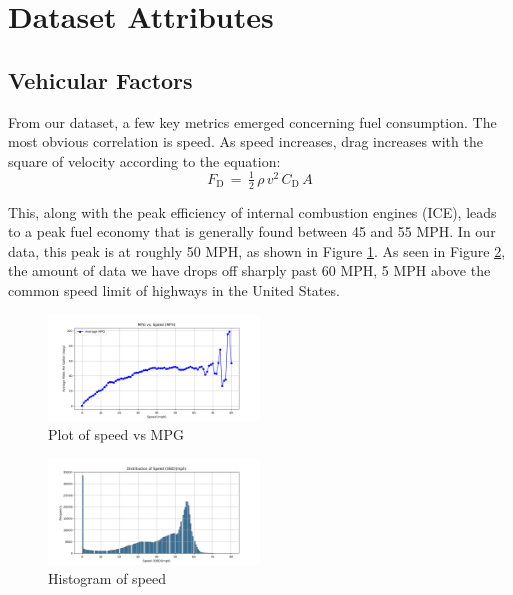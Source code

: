 \documentclass[letterpaper]{article}
\begin{document}
\section*{Dataset Attributes}

\subsection*{Vehicular Factors}

From our dataset, a few key metrics emerged concerning fuel consumption. 
The most obvious correlation is speed. As speed increases, drag increases 
with the square of velocity according to the equation: 
\[
    \displaystyle F_{\mathrm {D} }\,=\,{\tfrac {1}{2}}\,\rho \,v^{2}\,C_{\mathrm {D} }\,A
\] 

This, along with the peak efficiency of internal combustion engines (ICE), 
leads to a peak fuel economy that is generally found between 45 and 55 MPH. 
In our data, this peak is at roughly 50 MPH, as shown in Figure \ref{fig:mpgspeed}. 
As seen in Figure \ref{fig:histmpgspeed}, the amount of data we have drops off sharply 
past 60 MPH, 5 MPH above the common speed limit of highways in the United 
States.

\begin{figure}[htbp]
    \centering
    \includegraphics[width=0.5\textwidth]{figures/speed_vs_mpg.png}
    \caption{Plot of speed vs MPG}
    \label{fig:mpgspeed}
\end{figure}

\begin{figure}[htbp]
    \centering
    \includegraphics[width=0.5\textwidth]{figures/histogram_speedobdmph.png}
    \caption{Histogram of speed}
    \label{fig:histmpgspeed}
\end{figure}
\end{document}
